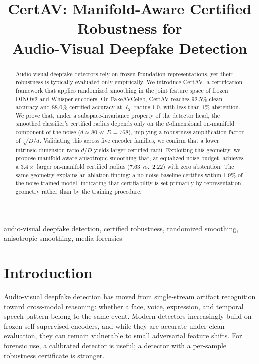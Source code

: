 \documentclass{article}
\title{CertAV: Manifold-Aware Certified Robustness for\\ Audio-Visual Deepfake Detection}
\begin{document}
\ninept
\maketitle

\begin{abstract}
Audio-visual deepfake detectors rely on frozen foundation representations, yet their robustness is typically evaluated only empirically. We introduce CertAV, a certification framework that applies randomized smoothing in the joint feature space of frozen DINOv2 and Whisper encoders. On FakeAVCeleb, CertAV reaches $92.5\%$ clean accuracy and $88.0\%$ certified accuracy at $\ell_2$ radius $1.0$, with less than $1\%$ abstention. We prove that, under a subspace-invariance property of the detector head, the smoothed classifier's certified radius depends only on the $d$-dimensional on-manifold component of the noise ($d\!\approx\!80 \ll D\!=\!768$), implying a robustness amplification factor of $\sqrt{D/d}$. Validating this across five encoder families, we confirm that a lower intrinsic-dimension ratio $d/D$ yields larger certified radii. Exploiting this geometry, we propose manifold-aware anisotropic smoothing that, at equalized noise budget, achieves a $3.4\times$ larger on-manifold certified radius ($7.63$ vs.\ $2.22$) with zero abstention. The same geometry explains an ablation finding: a no-noise baseline certifies within $1.9\%$ of the noise-trained model, indicating that certifiability is set primarily by representation geometry rather than by the training procedure.
\end{abstract}

\begin{keywords}
audio-visual deepfake detection, certified robustness, randomized smoothing, anisotropic smoothing, media forensics
\end{keywords}

\section{Introduction}
\label{sec:intro}

Audio-visual deepfake detection has moved from single-stream artifact recognition toward cross-modal reasoning: whether a face, voice, expression, and temporal speech pattern belong to the same event. Modern detectors increasingly build on frozen self-supervised encoders, and while they are accurate under clean evaluation, they can remain vulnerable to small adversarial feature shifts. For forensic use, a calibrated detector is useful; a detector with a per-sample robustness certificate is stronger.
\end{document}
